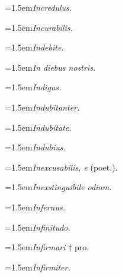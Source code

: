 \par{\dictfontsize\hangindent=1.5em\noindent \textit{Incredulus.} \par}
\par{\dictfontsize\hangindent=1.5em\noindent \textit{Incurabilis.} \par}
\par{\dictfontsize\hangindent=1.5em\noindent \textit{Indebite.} \par}
\par{\dictfontsize\hangindent=1.5em\noindent \textit{In diebus nostris.} \par}
\par{\dictfontsize\hangindent=1.5em\noindent \textit{Indigus.} \par}
\par{\dictfontsize\hangindent=1.5em\noindent \textit{Indubitanter.} \par}
\par{\dictfontsize\hangindent=1.5em\noindent \textit{Indubitate.} \par}
\par{\dictfontsize\hangindent=1.5em\noindent \textit{Indubius.} \par}
\par{\dictfontsize\hangindent=1.5em\noindent \textit{Inexcusabilis, e} (poet.). \par}
\par{\dictfontsize\hangindent=1.5em\noindent \textit{Inexstinguibile odium.} \par}
\par{\dictfontsize\hangindent=1.5em\noindent \textit{Infernus.} \par}
\par{\dictfontsize\hangindent=1.5em\noindent \textit{Infinitudo.} \par}
\par{\dictfontsize\hangindent=1.5em\noindent \textit{Infirmari} † pro. \par}
\par{\dictfontsize\hangindent=1.5em\noindent \textit{Infirmiter.} \par}
